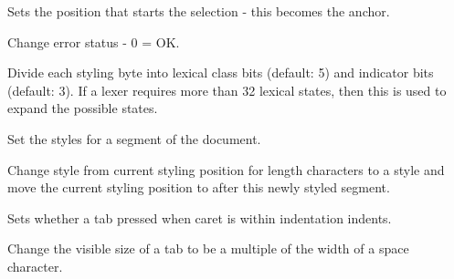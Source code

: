 \label{wxstyledtextctrlsetselectionstart}


Sets the position that starts the selection - this becomes the anchor.


\label{wxstyledtextctrlsetstatus}


Change error status - 0 = OK.


\label{wxstyledtextctrlsetstylebits}


Divide each styling byte into lexical class bits (default: 5) and indicator
bits (default: 3). If a lexer requires more than 32 lexical states, then this
is used to expand the possible states.


\label{wxstyledtextctrlsetstylebytes}


Set the styles for a segment of the document.


\label{wxstyledtextctrlsetstyling}


Change style from current styling position for length characters to a style
and move the current styling position to after this newly styled segment.


\label{wxstyledtextctrlsettabindents}


Sets whether a tab pressed when caret is within indentation indents.


\label{wxstyledtextctrlsettabwidth}


Change the visible size of a tab to be a multiple of the width of a space character.


\label{wxstyledtextctrlsettargetend}

